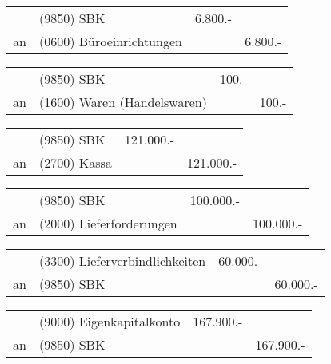 \documentclass[parskip=half,12pt,a4paper]{scrartcl}
\begin{document}
\begin{center}
\begin{tabularx}{\textwidth}{rXrr}
 \toprule
    & (9850) SBK & 6.800.- &\\
 an & (0600) Büroeinrichtungen & & 6.800.-\\
\bottomrule
\end{tabularx}
\end{center}

\begin{center}
\begin{tabularx}{\textwidth}{rXrr}
 \toprule
    & (9850) SBK & 100.- &\\
 an & (1600) Waren (Handelswaren) & & 100.-\\
\bottomrule
\end{tabularx}
\end{center}

\begin{center}
\begin{tabularx}{\textwidth}{rXrr}
 \toprule
    & (9850) SBK & 121.000.- &\\
 an & (2700) Kassa & & 121.000.-\\
\bottomrule
\end{tabularx}
\end{center}

\begin{center}
\begin{tabularx}{\textwidth}{rXrr}
 \toprule
    & (9850) SBK & 100.000.- &\\
 an & (2000) Lieferforderungen & & 100.000.-\\
\bottomrule
\end{tabularx}
\end{center}

\begin{center}
\begin{tabularx}{\textwidth}{rXrr}
 \toprule
    & (3300) Lieferverbindlichkeiten & 60.000.- &\\
 an & (9850) SBK & & 60.000.-\\
\bottomrule
\end{tabularx}
\end{center}

\begin{center}
\begin{tabularx}{\textwidth}{rXrr}
 \toprule
    & (9000) Eigenkapitalkonto & 167.900.- &\\
 an & (9850) SBK & & 167.900.-\\
\bottomrule
\end{tabularx}
\end{center}
\end{document}
